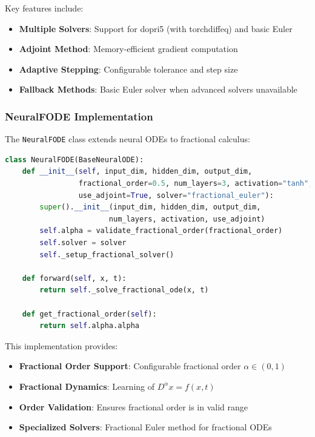 Key features include:
\begin{itemize}
    \item \textbf{Multiple Solvers}: Support for dopri5 (with torchdiffeq) and basic Euler
    \item \textbf{Adjoint Method}: Memory-efficient gradient computation
    \item \textbf{Adaptive Stepping}: Configurable tolerance and step size
    \item \textbf{Fallback Methods}: Basic Euler solver when advanced solvers unavailable
\end{itemize}

\subsubsection{NeuralFODE Implementation}

The \texttt{NeuralFODE} class extends neural ODEs to fractional calculus:

\begin{lstlisting}[language=Python, caption=NeuralFODE Implementation]
class NeuralFODE(BaseNeuralODE):
    def __init__(self, input_dim, hidden_dim, output_dim,
                 fractional_order=0.5, num_layers=3, activation="tanh",
                 use_adjoint=True, solver="fractional_euler"):
        super().__init__(input_dim, hidden_dim, output_dim, 
                        num_layers, activation, use_adjoint)
        self.alpha = validate_fractional_order(fractional_order)
        self.solver = solver
        self._setup_fractional_solver()
    
    def forward(self, x, t):
        return self._solve_fractional_ode(x, t)
    
    def get_fractional_order(self):
        return self.alpha.alpha
\end{lstlisting}

This implementation provides:
\begin{itemize}
    \item \textbf{Fractional Order Support}: Configurable fractional order $\alpha \in (0,1)$
    \item \textbf{Fractional Dynamics}: Learning of $D^{\alpha} x = f(x, t)$
    \item \textbf{Order Validation}: Ensures fractional order is in valid range
    \item \textbf{Specialized Solvers}: Fractional Euler method for fractional ODEs
\end{itemize}

